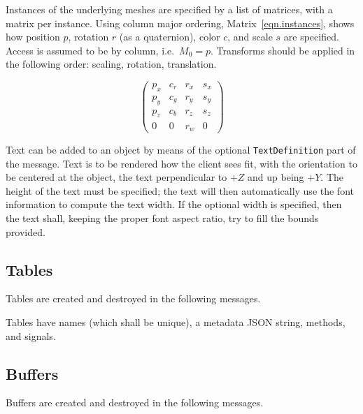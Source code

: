 \documentclass[11pt, oneside]{amsart}
\begin{document}
Instances of the underlying meshes are specified by a list of matrices, with a matrix per instance. Using column major ordering, Matrix~\ref{eqn.instances}, shows how position $p$, rotation $r$ (as a quaternion), color $c$, and scale $s$ are specified. Access is assumed to be by column, i.e.\ $M_0 = p$. Transforms should be applied in the following order: scaling, rotation, translation.

\begin{equation}
\label{eqn.instances}
\left(
\begin{array}{cccc}
p_x & c_r & r_x & s_x \\
p_y & c_g & r_y & s_y \\
p_z & c_b & r_z & s_z \\
0 & 0 & r_w & 0
\end{array}
\right)
\end{equation}

Text can be added to an object by means of the optional \texttt{TextDefinition} part of the message. Text is to be rendered how the client sees fit, with the orientation to be centered at the object, the text perpendicular to $+Z$ and up being $+Y$. The height of the text must be specified; the text will then automatically use the font information to compute the text width. If the optional width is specified, then the text shall, keeping the proper font aspect ratio, try to fill the bounds provided.

\subsection{Tables}

Tables are created and destroyed in the following messages.



Tables have names (which shall be unique), a metadata JSON string, methods, and signals.

\subsection{Buffers}

Buffers are created and destroyed in the following messages.


\end{document}
